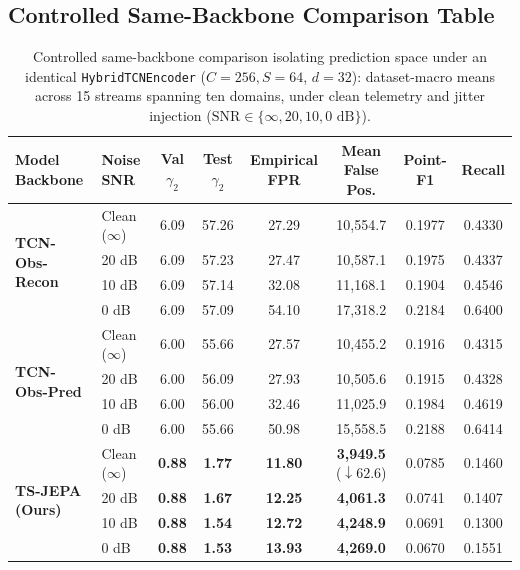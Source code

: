 \subsection{Controlled Same-Backbone Comparison Table}
\begin{table}[t]

\caption{Controlled same-backbone comparison isolating prediction space under an identical \texttt{HybridTCNEncoder} ($C{=}256, S{=}64$, $d{=}32$): dataset-macro means across 15 streams spanning ten domains, under clean telemetry and jitter injection ($\text{SNR} \in \{\infty, 20, 10, 0\text{ dB}\}$).}

\label{tab:controlled_backbone}
\scriptsize
\setlength{\tabcolsep}{2.5pt}
\begin{tabular}{@{}llcccccc@{}}
\toprule
\textbf{Model Backbone} & \textbf{Noise SNR} & \textbf{Val $\gamma_2$} & \textbf{Test $\gamma_2$} & \textbf{Empirical FPR} & \textbf{Mean False Pos.} & \textbf{Point-F1} & \textbf{Recall} \\
\midrule
\multirow{4}{*}{\textbf{TCN-Obs-Recon}} 
 & Clean ($\infty$) & 6.09 & 57.26 & 27.29 & 10,554.7 & 0.1977 & 0.4330 \\
 & 20 dB            & 6.09 & 57.23 & 27.47 & 10,587.1 & 0.1975 & 0.4337 \\
 & 10 dB            & 6.09 & 57.14 & 32.08 & 11,168.1 & 0.1904 & 0.4546 \\
 & 0 dB             & 6.09 & 57.09 & 54.10 & 17,318.2 & 0.2184 & 0.6400 \\
\midrule
\multirow{4}{*}{\textbf{TCN-Obs-Pred}} 
 & Clean ($\infty$) & 6.00 & 55.66 & 27.57 & 10,455.2 & 0.1916 & 0.4315 \\
 & 20 dB            & 6.00 & 56.09 & 27.93 & 10,505.6 & 0.1915 & 0.4328 \\
 & 10 dB            & 6.00 & 56.00 & 32.46 & 11,025.9 & 0.1984 & 0.4619 \\
 & 0 dB             & 6.00 & 55.66 & 50.98 & 15,558.5 & 0.2188 & 0.6414 \\
\midrule
\multirow{4}{*}{\textbf{TS-JEPA (Ours)}} 
 & Clean ($\infty$) & \textbf{0.88} & \textbf{1.77} & \textbf{11.80} & \textbf{3,949.5} ($\downarrow 62.6$) & 0.0785 & 0.1460 \\
 & 20 dB            & \textbf{0.88} & \textbf{1.67} & \textbf{12.25} & \textbf{4,061.3} & 0.0741 & 0.1407 \\
 & 10 dB            & \textbf{0.88} & \textbf{1.54} & \textbf{12.72} & \textbf{4,248.9} & 0.0691 & 0.1300 \\
 & 0 dB             & \textbf{0.88} & \textbf{1.53} & \textbf{13.93} & \textbf{4,269.0} & 0.0670 & 0.1551 \\
\bottomrule
\end{tabular}
\end{table}
